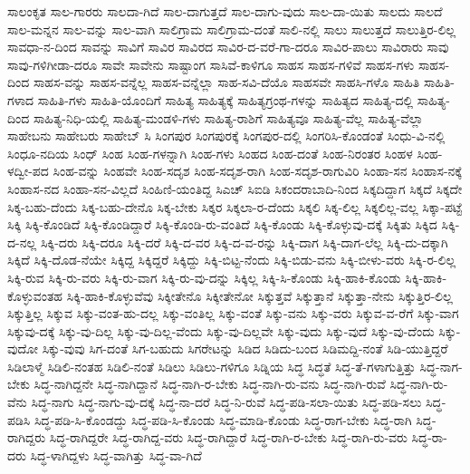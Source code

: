 {ಸಾಲಂಕೃತ
ಸಾಲ-ಗಾರರು
ಸಾಲದಾ-ಗಿದೆ
ಸಾಲ-ದಾಗುತ್ತದೆ
ಸಾಲ-ದಾಗು-ವುದು
ಸಾಲ-ದಾ-ಯಿತು
ಸಾಲದು
ಸಾಲದೆ
ಸಾಲ-ಮನ್ನನ
ಸಾಲ-ವನ್ನು
ಸಾಲ-ವಾಗಿ
ಸಾಲಿಗ್ರಾಮ
ಸಾಲಿಗ್ರಾಮ-ದಂತೆ
ಸಾಲಿ-ನಲ್ಲಿ
ಸಾಲು
ಸಾಲುತ್ತದೆ
ಸಾಲುತ್ತಿರ-ಲಿಲ್ಲ
ಸಾವಧಾ-ನ-ದಿಂದ
ಸಾವನ್ನು
ಸಾವಿಗೆ
ಸಾವಿರ
ಸಾವಿರದ
ಸಾವಿರ-ದ-ವರೆ-ಗಾ-ದರೂ
ಸಾವಿರ-ಪಾಲು
ಸಾವಿರಾರು
ಸಾವು
ಸಾವು-ಗಳಿಗೀಡಾ-ದರೂ
ಸಾವೇ
ಸಾವೇನು
ಸಾಷ್ಟಾಂಗ
ಸಾಸಿವೆ-ಕಾಳಿಗೂ
ಸಾಹಸ
ಸಾಹಸ-ಗಳಿವೆ
ಸಾಹಸ-ಗಳು
ಸಾಹಸ-ದಿಂದ
ಸಾಹಸ-ವನ್ನು
ಸಾಹಸ-ವನ್ನೆಲ್ಲ
ಸಾಹಸ-ವನ್ನೆಲ್ಲಾ
ಸಾಹ-ಸವಿ-ದೆಯೊ
ಸಾಹಸವೇ
ಸಾಹಸಿ-ಗಳೊ
ಸಾಹಿತಿ
ಸಾಹಿತಿ-ಗಳಾದ
ಸಾಹಿತಿ-ಗಳು
ಸಾಹಿತಿ-ಯೊಂದಿಗೆ
ಸಾಹಿತ್ಯ
ಸಾಹಿತ್ಯಕ್ಕೆ
ಸಾಹಿತ್ಯಗ್ರಂಥ-ಗಳನ್ನು
ಸಾಹಿತ್ಯದ
ಸಾಹಿತ್ಯ-ದಲ್ಲಿ
ಸಾಹಿತ್ಯ-ದಿಂದ
ಸಾಹಿತ್ಯ-ನಿಧಿ-ಯಲ್ಲಿ
ಸಾಹಿತ್ಯ-ಮಂಡಳಿ-ಗಳು
ಸಾಹಿತ್ಯ-ರಾಶಿಗೆ
ಸಾಹಿತ್ಯವೂ
ಸಾಹಿತ್ಯ-ವೆಲ್ಲ
ಸಾಹಿತ್ಯ-ವೆಲ್ಲಾ
ಸಾಹೇಬನು
ಸಾಹೇಬರು
ಸಾಹೇಬ್
ಸಿ
ಸಿಂಗಪುರ
ಸಿಂಗಪುರಕ್ಕೆ
ಸಿಂಗಪುರ-ದಲ್ಲಿ
ಸಿಂಗರಿಸಿ-ಕೊಂಡಂತೆ
ಸಿಂಧು-ವಿ-ನಲ್ಲಿ
ಸಿಂಧೂ-ನದಿಯ
ಸಿಂಧ್
ಸಿಂಹ
ಸಿಂಹ-ಗಳನ್ನಾಗಿ
ಸಿಂಹ-ಗಳು
ಸಿಂಹದ
ಸಿಂಹ-ದಂತೆ
ಸಿಂಹ-ನಿರಂತರ
ಸಿಂಹಳ
ಸಿಂಹ-ಳದ್ವೀ-ಪದ
ಸಿಂಹ-ವನ್ನು
ಸಿಂಹವೇ
ಸಿಂಹ-ಸದೃಶ
ಸಿಂಹ-ಸದೃಶ-ರಾಗಿ
ಸಿಂಹ-ಸದೃಶ-ರಾಗುವಿರಿ
ಸಿಂಹಾ-ಸನ
ಸಿಂಹಾಸ-ನಕ್ಕೆ
ಸಿಂಹಾಸ-ನದ
ಸಿಂಹಾ-ಸನ-ವಿಲ್ಲದೆ
ಸಿಂಹಿಣಿ-ಯಂತಿದ್ದ
ಸಿಎಚ್
ಸಿಐಡಿ
ಸಿಕಂದರಾಬಾದಿ-ನಿಂದ
ಸಿಕ್ಕದಿದ್ದಾಗ
ಸಿಕ್ಕದೆ
ಸಿಕ್ಕದೇ
ಸಿಕ್ಕ-ಬಹು-ದೆಂದು
ಸಿಕ್ಕ-ಬಹು-ದೇನೊ
ಸಿಕ್ಕ-ಬೇಕು
ಸಿಕ್ಕರ
ಸಿಕ್ಕಲಾ-ರ-ದೆಂದು
ಸಿಕ್ಕಲಿ
ಸಿಕ್ಕ-ಲಿಲ್ಲ
ಸಿಕ್ಕಲಿಲ್ಲ-ವಲ್ಲ
ಸಿಕ್ಕಾ-ಪಟ್ಟೆ
ಸಿಕ್ಕಿ
ಸಿಕ್ಕಿ-ಕೊಂಡಿದೆ
ಸಿಕ್ಕಿ-ಕೊಂಡಿದ್ದಾರೆ
ಸಿಕ್ಕಿ-ಕೊಂಡಿ-ರು-ವಂತಿದೆ
ಸಿಕ್ಕಿ-ಕೊಂಡು
ಸಿಕ್ಕಿ-ಕೊಳ್ಳುವು-ದಕ್ಕೆ
ಸಿಕ್ಕಿತು
ಸಿಕ್ಕಿದ
ಸಿಕ್ಕಿ-ದ-ನಲ್ಲ
ಸಿಕ್ಕಿ-ದರು
ಸಿಕ್ಕಿ-ದರೂ
ಸಿಕ್ಕಿ-ದರೆ
ಸಿಕ್ಕಿ-ದ-ವರ
ಸಿಕ್ಕಿ-ದ-ವ-ರನ್ನು
ಸಿಕ್ಕಿ-ದಾಗ
ಸಿಕ್ಕಿ-ದಾಗ-ಲೆಲ್ಲ
ಸಿಕ್ಕಿ-ದು-ದಕ್ಕಾಗಿ
ಸಿಕ್ಕಿದೆ
ಸಿಕ್ಕಿ-ದೊಡ-ನೆಯೇ
ಸಿಕ್ಕಿದ್ದ
ಸಿಕ್ಕಿದ್ದರೆ
ಸಿಕ್ಕಿದ್ದು
ಸಿಕ್ಕಿ-ಬಿಟ್ಟ-ನೆಂದು
ಸಿಕ್ಕಿ-ಬಿಡು-ವನು
ಸಿಕ್ಕಿ-ಬೀಳು-ವರು
ಸಿಕ್ಕಿ-ರ-ಲಿಲ್ಲ
ಸಿಕ್ಕಿ-ರುವ
ಸಿಕ್ಕಿ-ರು-ವರು
ಸಿಕ್ಕಿ-ರು-ವಾಗ
ಸಿಕ್ಕಿ-ರು-ವು-ದನ್ನು
ಸಿಕ್ಕಿಲ್ಲ
ಸಿಕ್ಕಿ-ಸಿ-ಕೊಂಡು
ಸಿಕ್ಕಿ-ಹಾಕಿ-ಕೊಂಡು
ಸಿಕ್ಕಿ-ಹಾಕಿ-ಕೊಳ್ಳುವಂತಹ
ಸಿಕ್ಕಿ-ಹಾಕಿ-ಕೊಳ್ಳುವೆವು
ಸಿಕ್ಕೀತೇನೊ
ಸಿಕ್ಕೀತೇನೋ
ಸಿಕ್ಕುತ್ತವೆ
ಸಿಕ್ಕುತ್ತಾನೆ
ಸಿಕ್ಕುತ್ತಾ-ನೇನು
ಸಿಕ್ಕುತ್ತಿರ-ಲಿಲ್ಲ
ಸಿಕ್ಕುತ್ತಿಲ್ಲ
ಸಿಕ್ಕುವ
ಸಿಕ್ಕು-ವಂತ-ಹು-ದಲ್ಲ
ಸಿಕ್ಕು-ವಂತಿಲ್ಲ
ಸಿಕ್ಕು-ವಂತೆ
ಸಿಕ್ಕು-ವನು
ಸಿಕ್ಕು-ವರು
ಸಿಕ್ಕುವ-ವ-ರೆಗೆ
ಸಿಕ್ಕು-ವಾಗ
ಸಿಕ್ಕುವು-ದಕ್ಕೆ
ಸಿಕ್ಕು-ವು-ದಿಲ್ಲ
ಸಿಕ್ಕು-ವು-ದಿಲ್ಲ-ವೆಂದು
ಸಿಕ್ಕು-ವು-ದಿಲ್ಲವೇ
ಸಿಕ್ಕು-ವುದು
ಸಿಕ್ಕು-ವುದೆ
ಸಿಕ್ಕು-ವು-ದೆಂದು
ಸಿಕ್ಕು-ವುದೋ
ಸಿಕ್ಕು-ವುವು
ಸಿಗ-ದಂತೆ
ಸಿಗ-ಬಹುದು
ಸಿಗರೇಟನ್ನು
ಸಿಡಿದ
ಸಿಡಿದು-ಬಂದ
ಸಿಡಿಮದ್ದಿ-ನಂತೆ
ಸಿಡಿ-ಯುತ್ತಿದ್ದರೆ
ಸಿಡಿಲಾಳ್ಮೆ
ಸಿಡಿಲಿ-ನಂತಹ
ಸಿಡಿಲಿ-ನಂತೆ
ಸಿಡಿಲು
ಸಿಡಿಲು-ಗಳಿಗೂ
ಸಿಡ್ನಿಯ
ಸಿದ್ಧ
ಸಿದ್ಧತೆ
ಸಿದ್ಧ-ತೆ-ಗಳಾಗುತ್ತಿತ್ತು
ಸಿದ್ಧ-ನಾಗ-ಬೇಕು
ಸಿದ್ಧ-ನಾಗಿದ್ದನೇ
ಸಿದ್ಧ-ನಾಗಿದ್ದಾನೆ
ಸಿದ್ಧ-ನಾಗಿ-ರ-ಬೇಕು
ಸಿದ್ಧ-ನಾಗಿ-ರು-ವನು
ಸಿದ್ಧ-ನಾಗಿ-ರುವೆ
ಸಿದ್ಧ-ನಾಗಿ-ರು-ವೆನು
ಸಿದ್ಧ-ನಾಗು
ಸಿದ್ಧ-ನಾಗು-ವು-ದಕ್ಕೆ
ಸಿದ್ಧ-ನಾ-ದರೆ
ಸಿದ್ಧ-ನಿ-ರುವೆ
ಸಿದ್ಧ-ಪಡಿ-ಸಲಾ-ಯಿತು
ಸಿದ್ಧ-ಪಡಿ-ಸಲು
ಸಿದ್ಧ-ಪಡಿಸಿ
ಸಿದ್ಧ-ಪಡಿ-ಸಿ-ಕೊಂಡದ್ದು
ಸಿದ್ಧ-ಪಡಿ-ಸಿ-ಕೊಂಡು
ಸಿದ್ಧ-ಮಾಡಿ-ಕೊಂಡು
ಸಿದ್ಧ-ರಾಗ-ಬೇಕು
ಸಿದ್ಧ-ರಾಗಿ
ಸಿದ್ಧ-ರಾಗಿದ್ದರು
ಸಿದ್ಧ-ರಾಗಿದ್ದರೇ
ಸಿದ್ಧ-ರಾಗಿದ್ದ-ವರು
ಸಿದ್ಧ-ರಾಗಿದ್ದಾರೆ
ಸಿದ್ಧ-ರಾಗಿ-ರ-ಬೇಕು
ಸಿದ್ಧ-ರಾಗಿ-ರು-ವರು
ಸಿದ್ಧ-ರಾ-ದರು
ಸಿದ್ಧ-ಳಾಗಿದ್ದಳು
ಸಿದ್ಧ-ವಾಗಿತ್ತು
ಸಿದ್ಧ-ವಾ-ಗಿದೆ
}
